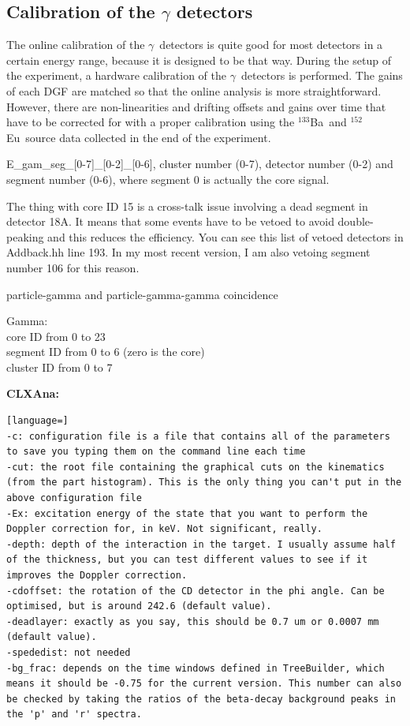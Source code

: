 \documentclass[twoside,english]{uiofysmaster/uiofysmaster}
\newcommand{\ga}{$\gamma$}
\newcommand{\Ba}{$^{133}$Ba}
\newcommand{\Eu}{$^{152}$Eu}
\begin{document}
\subsection{Calibration of the \texorpdfstring{$\gamma$}{gamma} detectors}\label{sec:gamma}

The online calibration of the \ga\ detectors is quite good for most detectors in a certain energy range, because it is designed to be that way. 
During the setup of the experiment, a hardware calibration of the \ga\ detectors is performed. 
The gains of each DGF are matched so that the online analysis is more straightforward.
However, there are non-linearities and drifting offsets and gains over time that have to be corrected for with a proper calibration using the \Ba\ and \Eu\ source data collected in the end of the experiment.


\bigskip


E\_gam\_seg\_[0-7]\_[0-2]\_[0-6], cluster number (0-7), detector number (0-2) and segment number (0-6), where segment 0 is actually the core signal.

The thing with core ID 15 is a cross-talk issue involving a dead segment in detector 18A. It means that some events have to be vetoed to avoid double-peaking and this reduces the efficiency. You can see this list of vetoed detectors in Addback.hh line 193. In my most recent version, I am also vetoing segment number 106 for this reason.

\bigskip

particle-gamma and particle-gamma-gamma coincidence

\bigskip

Gamma: \\
core ID from 0 to 23 \\
segment ID from 0 to 6 (zero is the core) \\
cluster ID from 0 to 7 \\


\bigskip


\textbf{CLXAna:}\newline
\begin{lstlisting}[language=]
-c: configuration file is a file that contains all of the parameters to save you typing them on the command line each time
-cut: the root file containing the graphical cuts on the kinematics (from the part histogram). This is the only thing you can't put in the above configuration file
-Ex: excitation energy of the state that you want to perform the Doppler correction for, in keV. Not significant, really.
-depth: depth of the interaction in the target. I usually assume half of the thickness, but you can test different values to see if it improves the Doppler correction.
-cdoffset: the rotation of the CD detector in the phi angle. Can be optimised, but is around 242.6 (default value).
-deadlayer: exactly as you say, this should be 0.7 um or 0.0007 mm (default value).
-spededist: not needed
-bg_frac: depends on the time windows defined in TreeBuilder, which means it should be -0.75 for the current version. This number can also be checked by taking the ratios of the beta-decay background peaks in the 'p' and 'r' spectra.
\end{lstlisting}
\end{document}
